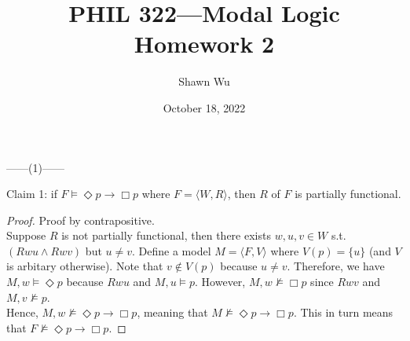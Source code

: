 \documentclass[12pt]{article}
\title{PHIL 322---Modal Logic \\Homework 2}
\author{Shawn Wu}
\date{October 18, 2022}
\newcommand{\B}{\Box}
\newcommand{\D}{\Diamond}
\newcommand{\ns}{\nvDash}
\begin{document}
\maketitle
\noindent
\begin{center}
    ------(1)------
\end{center}
Claim 1: if $F \vDash \D p \rightarrow \B p$ where $F = \langle W, R \rangle$, then $R$ of $F$ is partially functional. 
\begin{proof} Proof by contrapositive.\\
    Suppose $R$ is not partially functional, then there exists $w, u, v \in W$ s.t. $(Rwu \land Rwv)$ but $u \neq v$.
    Define a model $M = \langle F, V \rangle$ where $V(p) = \{ u \}$ (and $V$ is arbitary otherwise). 
    Note that $v \notin V(p)$ because $u \neq v$.
    Therefore, we have $M, w \vDash \D p$ because $Rwu$ and $M, u \vDash p$.
    However, $M, w \nvDash \B p$ since $Rwv$ and $M, v \ns p$.\\
    Hence, $M, w \ns \D p \to \B p$, meaning that $M \ns \D p \to \B p$.
    This in turn means that $F \ns \D p \to \B p$.
\end{proof}
\end{document}
